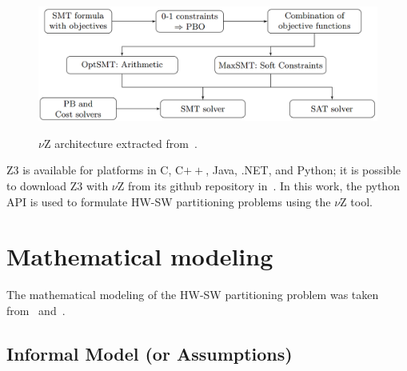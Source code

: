 \documentclass{doublecol-new}
\theoremstyle{TH}{
\newtheorem{lemma}{Lemma}
\newtheorem{theorem}[lemma]{Theorem}
\newtheorem{corrolary}[lemma]{Corrolary}
\newtheorem{conjecture}[lemma]{Conjecture}
\newtheorem{proposition}[lemma]{Proposition}
\newtheorem{claim}[lemma]{Claim}
\newtheorem{stheorem}[lemma]{Wrong Theorem}
\newtheorem{algorithm}{Algorithm}
}
\theoremstyle{THrm}{
\newtheorem{definition}{Definition}[section]
\newtheorem{question}{Question}[section]
\newtheorem{remark}{Remark}
\newtheorem{scheme}{Scheme}
}
\theoremstyle{THhit}{
\newtheorem{case}{Case}[section]
}
\begin{document}
\begin{figure}[ht]
	\caption{$\nu$Z architecture extracted from~\cite{Bjorner2015}.}
	\centering
	\includegraphics[scale=0.21]{figures/vzArch.png} 
	\label{vZ-Architecture}
\end{figure}

Z3 is available for platforms in C, C$++$, Java, .NET, and Python; it is possible to download Z3 with $\nu$Z from its github repository in~\cite{Z3API}. In this work, the python API is used to formulate HW-SW partitioning problems using the $\nu$Z tool. 

\section{Mathematical modeling}
\label{Mathematical-modeling}

The mathematical modeling of the HW-SW partitioning problem was taken from~\cite{Arato2003} and~\cite{Mann2007}.

\subsection{Informal Model (or Assumptions)}
\label{Informal-Model-or-Assumptions}
\end{document}
